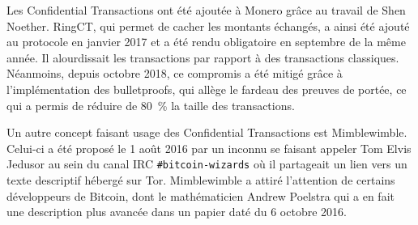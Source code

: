 Les Confidential Transactions ont été ajoutée à Monero grâce au travail de Shen Noether.  RingCT, qui permet de cacher les montants échangés, a ainsi été ajouté au protocole en janvier 2017 et a été rendu obligatoire en septembre de la même année. Il alourdissait les transactions par rapport à des transactions classiques. Néanmoins, depuis octobre 2018, ce compromis a été mitigé grâce à l'implémentation des bulletproofs, qui allège le fardeau des preuves de portée, ce qui a permis de réduire de 80~\% la taille des transactions.


Un autre concept faisant usage des Confidential Transactions est Mimblewimble. Celui-ci a été proposé le 1\ier{} août 2016 par un inconnu se faisant appeler Tom Elvis Jedusor au sein du canal IRC \texttt{\#bitcoin-wizards} où il partageait un lien vers un texte descriptif hébergé sur Tor. Mimblewimble a attiré l'attention de certains développeurs de Bitcoin, dont le mathématicien Andrew Poelstra qui a en fait une description plus avancée dans un papier daté du 6 octobre 2016.

